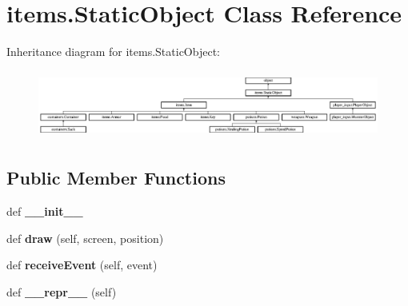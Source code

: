 \hypertarget{classitems_1_1_static_object}{}\section{items.\+Static\+Object Class Reference}
\label{classitems_1_1_static_object}
Inheritance diagram for items.\+Static\+Object\+:\begin{figure}[H]
\begin{center}
\leavevmode
\includegraphics[height=2.259887cm]{classitems_1_1_static_object}
\end{center}
\end{figure}
\subsection*{Public Member Functions}
\begin{DoxyCompactItemize}
\item 
\hypertarget{classitems_1_1_static_object_ac590040611a192bb8a2597e860724edf}{}def {\bfseries \+\_\+\+\_\+init\+\_\+\+\_\+}\label{classitems_1_1_static_object_ac590040611a192bb8a2597e860724edf}

\item 
\hypertarget{classitems_1_1_static_object_aa7627ab4f30471d813295f3b1eb8bdd2}{}def {\bfseries draw} (self, screen, position)\label{classitems_1_1_static_object_aa7627ab4f30471d813295f3b1eb8bdd2}

\item 
\hypertarget{classitems_1_1_static_object_a0c895afdbd62e6404880cf397c58b48d}{}def {\bfseries receive\+Event} (self, event)\label{classitems_1_1_static_object_a0c895afdbd62e6404880cf397c58b48d}

\item 
\hypertarget{classitems_1_1_static_object_a76bf587a60ab56d4f64504b2573b53d6}{}def {\bfseries \+\_\+\+\_\+repr\+\_\+\+\_\+} (self)\label{classitems_1_1_static_object_a76bf587a60ab56d4f64504b2573b53d6}

\end{DoxyCompactItemize}
